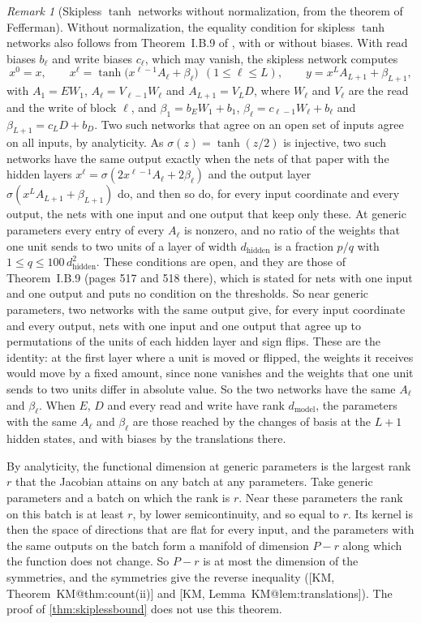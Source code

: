 \documentclass[10pt]{article}
\makeatletter
\theoremstyle{definition}
\theoremstyle{remark}
\newtheorem{remark}[theorem]{Remark}
\newcommand{\dm}{d_{\mathrm{model}}}
\newcommand{\dhid}{d_{\mathrm{hidden}}}
\newcommand{\KMn}[1]{\csname KM@#1\endcsname}
\newcommand{\KM}[2]{[KM, #1~\KMn{#2}]}
\newcommand{\KMp}[3]{[KM, #1~\KMn{#2}(#3)]}
\makeatother
\begin{document}
\begin{remark}[Skipless $\tanh$ networks without normalization, from the theorem of Fefferman]\label{rem:fefferman}
Without normalization, the equality condition for skipless $\tanh$ networks also follows from Theorem~I.B.9 of \citet{fefferman1994}, with or without biases. With read biases $b_\ell$ and write biases $c_\ell$, which may vanish, the skipless network computes
\[
x^0 = x,\qquad x^\ell = \tanh\big(x^{\ell-1}A_\ell + \beta_\ell\big)\ \ (1 \le \ell \le L),\qquad y = x^LA_{L+1} + \beta_{L+1},
\]
with $A_1 = EW_1$, $A_\ell = V_{\ell-1}W_\ell$ and $A_{L+1} = V_LD$, where $W_\ell$ and $V_\ell$ are the read and the write of block $\ell$, and $\beta_1 = b_EW_1 + b_1$, $\beta_\ell = c_{\ell-1}W_\ell + b_\ell$ and $\beta_{L+1} = c_LD + b_D$. Two such networks that agree on an open set of inputs agree on all inputs, by analyticity. As $\sigma(z) = \tanh(z/2)$ is injective, two such networks have the same output exactly when the nets of that paper with the hidden layers $x^\ell = \sigma(2x^{\ell-1}A_\ell + 2\beta_\ell)$ and the output layer $\sigma(x^LA_{L+1} + \beta_{L+1})$ do, and then so do, for every input coordinate and every output, the nets with one input and one output that keep only these. At generic parameters every entry of every $A_\ell$ is nonzero, and no ratio of the weights that one unit sends to two units of a layer of width $\dhid$ is a fraction $p/q$ with $1 \le q \le 100\,\dhid^2$. These conditions are open, and they are those of Theorem~I.B.9 (pages 517 and 518 there), which is stated for nets with one input and one output and puts no condition on the thresholds. So near generic parameters, two networks with the same output give, for every input coordinate and every output, nets with one input and one output that agree up to permutations of the units of each hidden layer and sign flips. These are the identity: at the first layer where a unit is moved or flipped, the weights it receives would move by a fixed amount, since none vanishes and the weights that one unit sends to two units differ in absolute value. So the two networks have the same $A_\ell$ and $\beta_\ell$. When $E$, $D$ and every read and write have rank $\dm$, the parameters with the same $A_\ell$ and $\beta_\ell$ are those reached by the changes of basis at the $L+1$ hidden states, and with biases by the translations there.

By analyticity, the functional dimension at generic parameters is the largest rank $r$ that the Jacobian attains on any batch at any parameters. Take generic parameters and a batch on which the rank is $r$. Near these parameters the rank on this batch is at least $r$, by lower semicontinuity, and so equal to $r$. Its kernel is then the space of directions that are flat for every input, and the parameters with the same outputs on the batch form a manifold of dimension $P - r$ along which the function does not change. So $P - r$ is at most the dimension of the symmetries, and the symmetries give the reverse inequality (\KMp{Theorem}{thm:count}{ii} and \KM{Lemma}{lem:translations}). The proof of \cref{thm:skiplessbound} does not use this theorem.
\end{remark}
\end{document}
